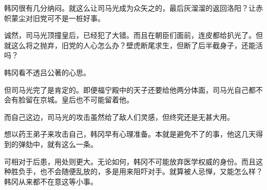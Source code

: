 韩冈很有几分纳闷。就这么让司马光成为众矢之的，最后灰溜溜的返回洛阳？让赤帜蒙尘对旧党可不是一桩好事。 

诚然，司马光顶撞皇后，已经犯了大错。而且在朝臣们面前，连皮都给扒光了。但就这么将之抛弃，旧党的人心怎么办？壁虎断尾求生，但断了后半截身子，还能活吗？ 

韩冈看不透吕公著的心思。 

但司马光完了是肯定的。即便福宁殿中的天子还要给他两分体面，司马光自己都不会有脸留在京城。皇后也不可能留着他。 

而自己这边，司马光的攻击虽然给了敌人们灵感，但终究还是无甚大用。 

想以药王弟子来攻击自己，韩冈早有心理准备。本就是避免不了的事，他这几天得到的弹劾中，就有这么一条。 

可相对于后患，用处则更大。无论如何，韩冈不可能放弃医学权威的身份。而且这种胜负手，也不会随便乱放的，多是用来阻吓对手。就算被人忌惮，又能怎么样？韩冈从来都不在意这等小事。 

